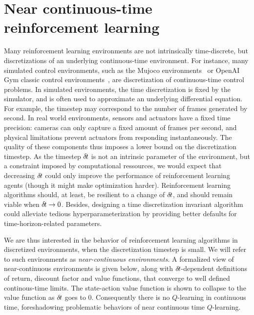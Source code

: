 \section{Near continuous-time reinforcement learning}
\label{sec:framework}

Many reinforcement learning environments are not intrinsically
time-discrete, but discretizations of an underlying continuous-time
environment. For instance, many simulated control environments, such as
the Mujoco environments~\cite{ddpg} or OpenAI Gym classic control
environments~\cite{gym}, are discretization of continuous-time control
problems.  In simulated environments, the time discretization is fixed by
the simulator, and is often used to approximate an underlying
differential equation.  For example, the timestep may correspond to the
number of frames generated by second.  In real world environments,
sensors and actuators have a fixed time precision: cameras can only
capture a fixed amount of frames per second, and physical limitations
prevent actuators from responding instantaneously. The quality of these
components thus imposes a lower bound on the discretization timestep. As
the timestep ${\delta\hspace{-.1em}t}$ is not an intrinsic parameter of the
environment, but a constraint imposed by computational ressources, we
would expect that decreasing ${\delta\hspace{-.1em}t}$ could only improve the performance
of reinforcement learning agents (though it might make optimization
harder).  Reinforcement
learning algorithms should, at least, be resilient to a change of
${\delta\hspace{-.1em}t}$, and should remain viable when ${\delta\hspace{-.1em}t} \rightarrow 0$.
Besides, designing a time discretization invariant algorithm could
alleviate tedious hyperparameterization by providing better defaults for
time-horizon-related parameters.

We are thus interested in the behavior of reinforcement learning
algorithms in discretized environments, when the discretization timestep
is small. We will refer to such environments as \emph{near-continuous
environments}.
A formalized view of near-continuous environments is
given below, along with ${\delta\hspace{-.1em}t}$-dependent definitions of return, discount
factor and value functions, that converge to well defined
continous-time limits. The state-action value
function is shown to collapse to the value function as ${\delta\hspace{-.1em}t}$ goes to $0$.
Consequently there is no $Q$-learning in continuous time, foreshadowing
problematic behaviors of near continuous time $Q$-learning.

